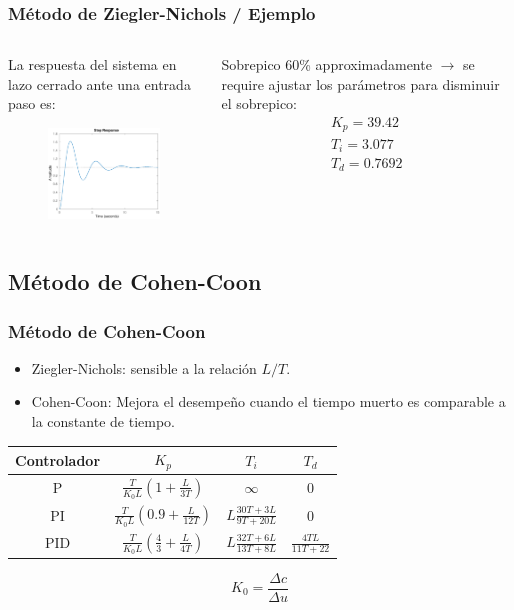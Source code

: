 \documentclass[aspectratio=169,handout]{beamer}
\theoremstyle{definition}
\theoremstyle{plain}
\theoremstyle{remark}
\begin{document}
\begin{frame}[<+->]\frametitle{Método de Ziegler-Nichols / Ejemplo}
\vspace*{5mm}
\begin{columns}
\begin{column}{0.5\textwidth}
	La respuesta del sistema en lazo cerrado ante una entrada paso es:
	\begin{figure}
		\includegraphics[width=7cm]{images/ejemplo1Respuesta.eps}
	\end{figure}
\end{column}	
\begin{column}{0.5\textwidth}
	Sobrepico 60\% approximadamente $\rightarrow$ se require ajustar los parámetros para disminuir el sobrepico:
	\begin{align*}
		K_p = 39.42\\
		T_i = 3.077\\
		T_d = 0.7692
	\end{align*}
\end{column}	
\end{columns}
\end{frame}

\subsection{Método de Cohen-Coon}
\begin{frame}[<+->]\frametitle{Método de Cohen-Coon}
  \begin{itemize}
 		\item Ziegler-Nichols: sensible a la relación $L/T$.
   	\item Cohen-Coon: Mejora el desempeño cuando el tiempo muerto es comparable a la constante de tiempo.
  \end{itemize}
  \begin{table}
  	\begin{tabular}{c|c|c|c}
  		Controlador & $K_p$ & $T_i$ & $T_d$\\
  		\hline
  		P   & $\frac{T}{K_0 L}\left(1   + \frac{L}{3T} \right)$ & $\infty$ & 0\\
  		PI  & $\frac{T}{K_0 L}\left(0.9 + \frac{L}{12T} \right)$ & $L \frac{30T+3L}{9T+20L}$ & 0\\
  		PID & $\frac{T}{K_0 L}\left(\frac{4}{3} + \frac{L}{4T} \right)$ & $L \frac{32T+6L}{13T+8L}$ & $\frac{4TL}{11T+22}$
  	\end{tabular}
  \end{table}
  \begin{equation*}
  	K_0 = \frac{\Delta c}{\Delta u}
  \end{equation*}
\end{frame}
\end{document}
